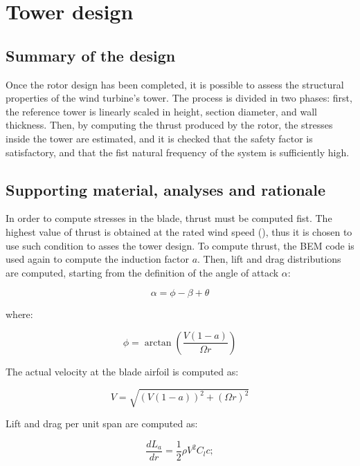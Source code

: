 \section{Tower design}

\subsection{Summary of the design}

Once the rotor design has been completed, it is possible to assess the structural properties of the wind turbine's tower. The process is divided in two phases: first, the reference tower is linearly scaled in height, section diameter, and wall thickness. Then, by computing the thrust produced by the rotor, the stresses inside the tower are estimated, and it is checked that the safety factor is satisfactory, and that the fist natural frequency of the system is sufficiently high.

\subsection{Supporting material, analyses and rationale}

In order to compute stresses in the blade, thrust must be computed fist. The highest value of thrust is obtained at the rated wind speed (\cite{hau}), thus it is chosen to use such condition to asses the tower design. 
To compute thrust, the BEM code is used again to compute the induction factor $a$. Then, lift and drag distributions are computed, starting from the definition of the angle of attack $\alpha$:

\begin{equation}
    \alpha = \phi - \beta + \theta 
\end{equation}

where:

\begin{equation}
    \phi = \arctan\left(\frac{V(1 - a)}{ \Omega r}\right)
\end{equation}

The actual velocity at the blade airfoil is computed as:

\begin{equation}
    V = \sqrt{ (V ( 1 - a )) ^ 2 + ( \Omega r ) ^ 2}
\end{equation}

Lift and drag per unit span are computed as:

\begin{equation}
    \frac{dL_a}{dr} = \frac{1}{2} \rho V ^ 2 C_l c;
\end{equation}


